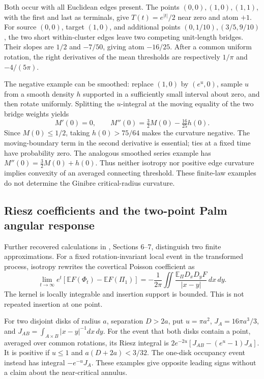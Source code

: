 \documentclass[11pt,a4paper]{article}
\theoremstyle{definition}
\theoremstyle{remark}
\numberwithin{equation}{section}
\begin{document}
Both occur with all Euclidean edges present. The points
$(0,0),(1,0),(1,1)$, with the first and last as terminals, give
$T(t)=e^{|t|}/2$ near zero and atom $+1$. For source $(0,0)$,
target $(1,0)$, and additional points $(0,1/10),(3/5,9/10)$,
the two short within-cluster edges leave two competing unit-length
bridges. Their slopes are $1/2$ and $-7/50$, giving atom $-16/25$.
After a common uniform rotation, the right derivatives of the mean
thresholds are respectively $1/\pi$ and $-4/(5\pi)$.

The negative example can be smoothed: replace $(1,0)$ by $(e^u,0)$,
sample $u$ from a smooth density $h$ supported in a sufficiently small
interval about zero, and then rotate uniformly. Splitting the
$u$-integral at the moving equality of the two bridge weights yields
\begin{equation}\label{ell:negative-curvature}
 M'(0)=0,\qquad
 M''(0)=\tfrac32M(0)-\tfrac{16}{25}h(0).
\end{equation}
Since $M(0)\le1/2$, taking $h(0)>75/64$ makes the curvature negative.
The moving-boundary term in the second derivative is essential;
ties at a fixed time have probability zero. The analogous smoothed
series example has $M''(0)=\tfrac32M(0)+h(0)$.
Thus neither isotropy nor positive edge curvature implies convexity
of an averaged connecting threshold. These finite-law examples do
not determine the Ginibre critical-radius curvature.

\subsection{Riesz coefficients and the two-point Palm angular response}
\label{ell:riesz-palm}

Further recovered calculations in ,
Sections 6--7, distinguish two finite approximations. For a fixed
rotation-invariant local event in the transformed process, isotropy
rewrites the covertical Poisson coefficient as
\begin{equation}\label{ell:riesz}
 \lim_{t\to\infty}e^t[\mathbb EF(\Phi_t)-\mathbb EF(\Pi_1)]
 =-\frac1{2\pi}\iint
       \frac{\mathbb E_\Pi D_xD_yF}{|x-y|}\,dx\,dy.
\end{equation}
The kernel is locally integrable and insertion support is bounded.
This is not repeated insertion at one point.

For two disjoint disks of radius $a$, separation $D>2a$, put
$u=\pi a^2$, $J_A=16\pi a^3/3$, and
$J_{AB}=\int_{A\times B}|x-y|^{-1}dx\,dy$.
For the event that both disks contain a point, averaged over common
rotations, its Riesz integral is
$2e^{-2u}[J_{AB}-(e^u-1)J_A]$.
It is positive if $u\le1$ and $a(D+2a)<3/32$.
The one-disk occupancy event instead has integral $-e^{-u}J_A$.
These examples give opposite leading signs without a claim about
the near-critical annulus.
\end{document}
